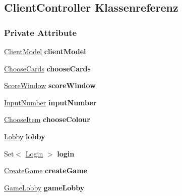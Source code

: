 \hypertarget{a00001}{\subsection{Client\-Controller Klassenreferenz}
\label{a00001}
}
\subsubsection*{Private Attribute}
\begin{DoxyCompactItemize}
\item 
\hypertarget{a00001_aeee73dcfea555623a589e65010399eaf}{\hyperlink{a00003}{Client\-Model} {\bfseries client\-Model}}\label{a00001_aeee73dcfea555623a589e65010399eaf}

\item 
\hypertarget{a00001_a8d0b635bc8b4d601f1e7dd85732c1245}{\hyperlink{a00006}{Choose\-Cards} {\bfseries choose\-Cards}}\label{a00001_a8d0b635bc8b4d601f1e7dd85732c1245}

\item 
\hypertarget{a00001_ab57e9e209576865069755de4c4e377a3}{\hyperlink{a00021}{Score\-Window} {\bfseries score\-Window}}\label{a00001_ab57e9e209576865069755de4c4e377a3}

\item 
\hypertarget{a00001_adc3bab7e9dcd72055c31db401670f437}{\hyperlink{a00014}{Input\-Number} {\bfseries input\-Number}}\label{a00001_adc3bab7e9dcd72055c31db401670f437}

\item 
\hypertarget{a00001_a94ef0dda8016331bdfb383890d5b9a2f}{\hyperlink{a00007}{Choose\-Item} {\bfseries choose\-Colour}}\label{a00001_a94ef0dda8016331bdfb383890d5b9a2f}

\item 
\hypertarget{a00001_a1ceda0e43f669c3e085049af1edf3d7c}{\hyperlink{a00016}{Lobby} {\bfseries lobby}}\label{a00001_a1ceda0e43f669c3e085049af1edf3d7c}

\item 
\hypertarget{a00001_a3f650acfc02c6c44d39569d0dfc14280}{Set$<$ \hyperlink{a00017}{Login} $>$ {\bfseries login}}\label{a00001_a3f650acfc02c6c44d39569d0dfc14280}

\item 
\hypertarget{a00001_a51742304042c32542a8614a351eede77}{\hyperlink{a00008}{Create\-Game} {\bfseries create\-Game}}\label{a00001_a51742304042c32542a8614a351eede77}

\item 
\hypertarget{a00001_a90e646761a83be0ae79058c1129dd00e}{\hyperlink{a00012}{Game\-Lobby} {\bfseries game\-Lobby}}\label{a00001_a90e646761a83be0ae79058c1129dd00e}


\end{DoxyCompactItemize}
